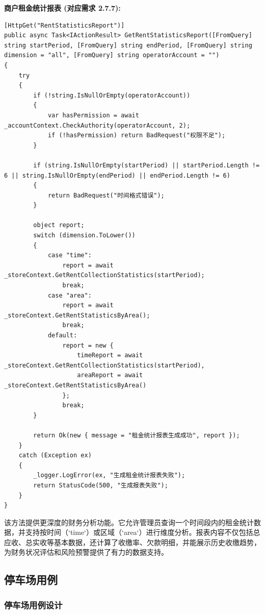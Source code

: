 \documentclass[]{article}
\begin{document}
\textbf{商户租金统计报表 (对应需求 2.7.7):}
\begin{verbatim}
[HttpGet("RentStatisticsReport")]
public async Task<IActionResult> GetRentStatisticsReport([FromQuery] string startPeriod, [FromQuery] string endPeriod, [FromQuery] string dimension = "all", [FromQuery] string operatorAccount = "")
{
    try
    {
        if (!string.IsNullOrEmpty(operatorAccount))
        {
            var hasPermission = await _accountContext.CheckAuthority(operatorAccount, 2);
            if (!hasPermission) return BadRequest("权限不足");
        }

        if (string.IsNullOrEmpty(startPeriod) || startPeriod.Length != 6 || string.IsNullOrEmpty(endPeriod) || endPeriod.Length != 6)
        {
            return BadRequest("时间格式错误");
        }

        object report;
        switch (dimension.ToLower())
        {
            case "time":
                report = await _storeContext.GetRentCollectionStatistics(startPeriod);
                break;
            case "area":
                report = await _storeContext.GetRentStatisticsByArea();
                break;
            default:
                report = new {
                    timeReport = await _storeContext.GetRentCollectionStatistics(startPeriod),
                    areaReport = await _storeContext.GetRentStatisticsByArea()
                };
                break;
        }

        return Ok(new { message = "租金统计报表生成成功", report });
    }
    catch (Exception ex)
    {
        _logger.LogError(ex, "生成租金统计报表失败");
        return StatusCode(500, "生成报表失败");
    }
}
\end{verbatim}
该方法提供更深度的财务分析功能。它允许管理员查询一个时间段内的租金统计数据，并支持按时间（`time`）或区域（`area`）进行维度分析。报表内容不仅包括总应收、总实收等基本数据，还计算了收缴率、欠款明细，并能展示历史收缴趋势，为财务状况评估和风险预警提供了有力的数据支持。

\hypertarget{ux505cux8f66ux573aux7528ux4f8b}{%
\subsection{停车场用例}\label{ux505cux8f66ux573aux7528ux4f8b}}

\hypertarget{ux505cux8f66ux573aux7528ux4f8bux8bbeux8ba1}{%
\subsubsection{停车场用例设计}\label{ux505cux8f66ux573aux7528ux4f8bux8bbeux8ba1}}
\end{document}
